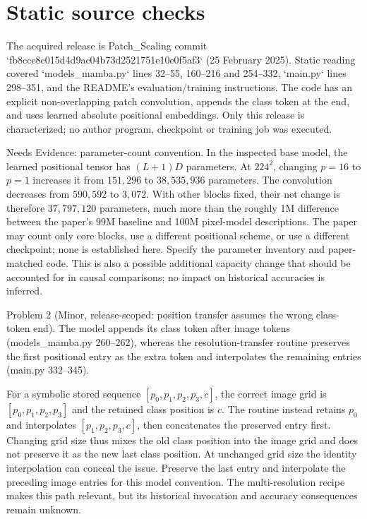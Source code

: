 \documentclass[10pt]{article}
\begin{document}
\section*{Static source checks}
The acquired release is Patch\_Scaling commit `fb8cce8c015d4d9ac04b73d2521751e10e0f5af3` (25 February 2025). Static reading covered `models\_mamba.py` lines 32–55, 160–216 and 254–332, `main.py` lines 298–351, and the README’s evaluation/training instructions. The code has an explicit non-overlapping patch convolution, appends the class token at the end, and uses learned absolute positional embeddings. Only this release is characterized; no author program, checkpoint or training job was executed.\par
Needs Evidence: parameter-count convention. In the inspected base model, the learned positional tensor has \((L+1)D\) parameters. At \(224^2\), changing \(p=16\) to \(p=1\) increases it from \(151{,}296\) to \(38{,}535{,}936\) parameters. The convolution decreases from \(590{,}592\) to \(3{,}072\). With other blocks fixed, their net change is therefore \(37{,}797{,}120\) parameters, much more than the roughly 1M difference between the paper’s 99M baseline and 100M pixel-model descriptions. The paper may count only core blocks, use a different positional scheme, or use a different checkpoint; none is established here. Specify the parameter inventory and paper-matched code. This is also a possible additional capacity change that should be accounted for in causal comparisons; no impact on historical accuracies is inferred.\par
Problem 2 (Minor, release-scoped: position transfer assumes the wrong class-token end).  The model appends its class token after image tokens (models\_mamba.py 260–262), whereas the resolution-transfer routine preserves the first positional entry as the extra token and interpolates the remaining entries (main.py 332–345).\par
For a symbolic stored sequence \([p_0,p_1,p_2,p_3,c]\), the correct image grid is \([p_0,p_1,p_2,p_3]\) and the retained class position is \(c\). The routine instead retains \(p_0\) and interpolates \([p_1,p_2,p_3,c]\), then concatenates the preserved entry first. Changing grid size thus mixes the old class position into the image grid and does not preserve it as the new last class position. At unchanged grid size the identity interpolation can conceal the issue. Preserve the last entry and interpolate the preceding image entries for this model convention. The multi-resolution recipe makes this path relevant, but its historical invocation and accuracy consequences remain unknown.\par
\end{document}
